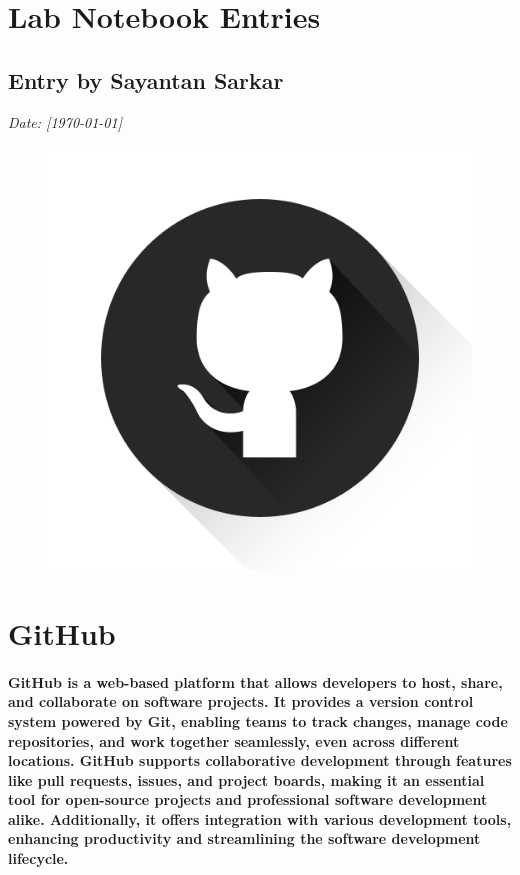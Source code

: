 \documentclass[12pt, a4paper]{article}
\begin{document}
\section*{\Huge{\textcolor{blue!60}{Lab Notebook Entries}}}

\subsection*{Entry by Sayantan Sarkar}
\textit{Date: [\today]}\\

\begin{figure}[h!]
   \centering
    \includegraphics[width=0.5\linewidth]{Github.png}
\end{figure}

\vspace{-1cm} %

\section*{\Huge{GitHub}}
\paragraph{GitHub is a web-based platform that allows developers to host, share, and collaborate on software projects. It provides a version control system powered by Git, enabling teams to track changes, manage code repositories, and work together seamlessly, even across different locations. GitHub supports collaborative development through features like pull requests, issues, and project boards, making it an essential tool for open-source projects and professional software development alike. Additionally, it offers integration with various development tools, enhancing productivity and streamlining the software development lifecycle.}
\end{document}
